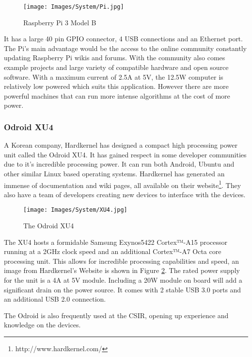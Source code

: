 				\begin{figure}[H]
					\centering
					\texttt{[image: Images/System/Pi.jpg]}     
					\caption{Raspberry Pi 3 Model B}
					\label{IM_Pi}
				\end{figure}
				
				It has a large 40 pin GPIO connector, 4 USB connections and an Ethernet port. The Pi's main advantage would be the access to the online community constantly updating Raspberry Pi wikis and forums. With the community also comes example projects and large variety of compatible hardware and open source software. With a maximum current of 2.5A at 5V, the 12.5W computer is relatively low powered which suits this application. However there are more powerful machines that can run more intense algorithms at the cost of more power.
		
				\subsubsection{Odroid XU4}
				A Korean company, Hardkernel has designed a compact high processing power unit called the Odroid XU4. It has gained respect in some developer communities due to it's incredible processing power. It can run both Android, Ubuntu and other similar Linux based operating systems. Hardkernel has generated an immense of documentation and wiki pages, all available on their website\footnote{http://www.hardkernel.com/}. They also have a team of developers creating new devices to interface with the devices. 
				
				\begin{figure}[H]
					\centering
					\texttt{[image: Images/System/XU4.jpg]}     
					\caption{The Odroid XU4}
					\label{IM_Odroid}
				\end{figure}
				
				The XU4 hosts a formidable Samsung Exynos5422 Cortex™-A15 processor running at a 2GHz clock speed and an additional Cortex™-A7 Octa core processing unit. This allows for incredible processing capabilities and speed, an image from Hardkernel's Website is shown in Figure \ref{IM_Odroid}. The rated power supply for the unit is a 4A at 5V module. Including a 20W module on board will add a significant drain on the power source. It comes with 2 stable USB 3.0 ports and an additional USB 2.0 connection. 
				
				The Odroid is also frequently used at the CSIR, opening up experience and knowledge on the devices.
		
